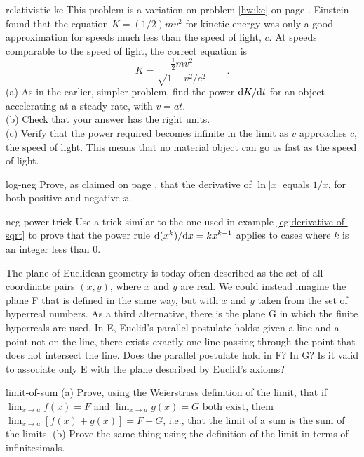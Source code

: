 \begin{hwsection}
\begin{hwwithsoln}{relativistic-ke}
This problem is a variation on problem \ref{hw:ke} on page \pageref{hw:ke}. Einstein found that the
equation $K=(1/2)mv^2$ for kinetic energy was only a good approximation for speeds much less than
the speed of light, $c$. At speeds comparable to the speed of light, the correct equation is
\begin{equation*}
  K = \frac{\frac{1}{2}mv^2}{\sqrt{1-v^2/c^2}} \qquad .
\end{equation*}
(a) As in the earlier, simpler problem, find the power $\textup{d} K/\textup{d} t$ for an object accelerating
at a steady rate, with $v=at$. \\
(b) Check that your answer has the right units.\\
(c) Verify that the power required becomes infinite in the limit as $v$ approaches $c$, the speed of
light. This means that no material object can go as fast as the speed of light.
\end{hwwithsoln}

\begin{hwwithsoln}{log-neg}
Prove, as claimed on page \pageref{log-neg},
that the derivative of $\ln |x|$ equals $1/x$, for both positive and negative $x$.
\end{hwwithsoln}

\begin{hwwithsoln}[2]{neg-power-trick}
Use a trick similar to the one used in example \ref{eg:derivative-of-sqrt} to prove that the power
rule $\textup{d}(x^k)/\textup{d} x=kx^{k-1}$ applies to cases where $k$ is an integer less than 0.
\end{hwwithsoln}

\begin{hw}[2]
The plane of Euclidean geometry is today often described as the set of all coordinate pairs $(x,y)$, where
$x$ and $y$ are real. We could instead imagine the plane F that is defined in the same way, but with $x$ and $y$ taken from the
set of hyperreal numbers. As a third alternative, there is the plane G in which the finite hyperreals are used.
In E, Euclid's parallel postulate holds: given a line and a point not on the line, there exists exactly one line passing
through the point that does not intersect the line. Does the parallel postulate hold in F? In G?
Is it valid to associate only E with the plane described by Euclid's axioms?
\end{hw}

\begin{hwwithsoln}{limit-of-sum}
(a) Prove, using the Weierstrass definition of the limit, that if $\lim_{x\rightarrow a} f(x) = F$ and $\lim_{x\rightarrow a} g(x) = G$ both exist,
them $\lim_{x\rightarrow a} [f(x)+g(x)] = F+G$, i.e., that the limit of a sum is the sum of the limits. (b) Prove the same thing using the
definition of the limit in terms of infinitesimals.
\end{hwwithsoln}


\end{hwsection}
